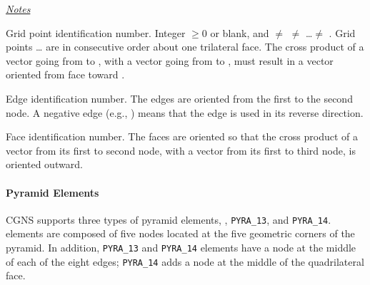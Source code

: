 {{{\uline{\textit{Notes}}%
\begin{Ventryi}{}
   \item [\fort{N1,\ldots,N10}]
         Grid point identification number.
         Integer $\ge 0$ or blank, and  $\ne$ 
         $\ne$ \ldots $\ne$ .
         Grid points \ldots{} are in consecutive order about
         one trilateral face.
         The cross product of a vector going from  to ,
         with a vector going from  to , must result in a
         vector oriented from face  toward .
   \item [\fort{E1,\ldots,E6}]
         Edge identification number.
         The edges are oriented from the first to the second node.
         A negative edge (e.g., ) means that the edge is used in
         its reverse direction.
   \item [\fort{F1,\ldots,F4}]
         Face identification number.
         The faces are oriented so that the cross product of a vector
         from its first to second node, with a vector from its first to
         third node, is oriented outward.
\end{Ventryi}

\paragraph{Pyramid Elements}
CGNS supports three types of pyramid elements, ,
\texttt{PYRA\_13}, and \texttt{PYRA\_14}.
 elements are composed of five nodes located at the
five geometric corners of the pyramid.
In addition, \texttt{PYRA\_13} and \texttt{PYRA\_14} elements have a node
at the middle of each of the eight edges; \texttt{PYRA\_14} adds a node
at the middle of the quadrilateral face.

}}}

